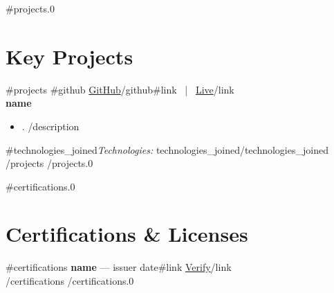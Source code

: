\documentclass[11pt,a4paper]{article}
\begin{document}
{{#projects.0}}
\section{Key Projects}
 {{#projects}}
\hfill{{#github}} \href{ {{github}} }{GitHub}{{/github}}{{#link}} \, | \, \href{ {{link}} }{Live}{{/link}}\\
\textbf{ {{name}} }
\begin{itemize}[leftmargin=*,nosep]
 {{#description}}
    \item {{.}}
 {{/description}}
\end{itemize}
 {{#technologies_joined}}\textit{Technologies:} {{technologies_joined}}{{/technologies_joined}}
 {{/projects}}
{{/projects.0}}

{{#certifications.0}}
\section{Certifications \& Licenses}
 {{#certifications}}
\textbf{ {{name}} } --- {{issuer}} \hfill {{date}}{{#link}} \hfill \href{ {{link}} }{Verify}{{/link}}\\
 {{/certifications}}
{{/certifications.0}}
\end{document}
